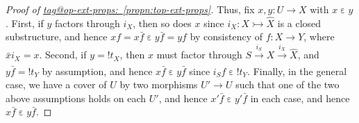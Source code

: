 \documentclass{amsart}
\makeatletter
\newcommand\ein{\mathrel{\varepsilon}}
\newcommand\tox[2][]{\xrightarrow[#1]{#2}}
\newcommand\tto{\rightarrowtail}
\newcommand\unex{{!}}
\newcommand\wh[1]{\widehat{#1}}
\newcommand\tagword[1]{\csname tag@#1\endcsname}
\def\label@tag#1:#2\@nil{#1}
\newcommand\labeltag[1]{\label@tag#1:\@nil}
\newcommand\jref[1]{%
  \texorpdfstring%
    {\hyperref[#1]{\tagword{\labeltag{#1}}~\ref*{#1}}}%
    {\tagword{\labeltag{#1}}~\ref*{#1}}%
}
\theoremstyle{definition}
\theoremstyle{remark}
\theoremstyle{plainwithref}
\makeatother
\begin{document}
\begin{proof}[Proof of \jref{propn:top-ext-props}]
  Thus, fix \( x,y \colon U \to X \) with \( x \ein y \).
  First, if \( y \) factors through \( i_X \), then so does \( x \) since \( i_X \colon X \tto \wh X \) is a closed substructure, and hence \( x f = x \bar f \ein y \bar f = y f \) by consistency of \( f \colon X \to Y \), where \( \bar x i_X = x \).
  Second, if \( y = \unex t_X \), then \( x \) must factor through \( S \tox{i_S} X \tox{i_X} \wh X \), and \( y \bar f = \unex t_Y \) by assumption, and hence \( x \bar f \ein y \bar f \) since \( i_S f \ein \unex t_Y \).
  Finally, in the general case, we have a cover of \( U \) by two morphisms \( U' \to U \) such that one of the two above assumptions holds on each \( U' \), and hence \( x' \bar f \ein y' \bar f \) in each case, and hence \( x \bar f \ein y \bar f \).
\end{proof}
\end{document}

